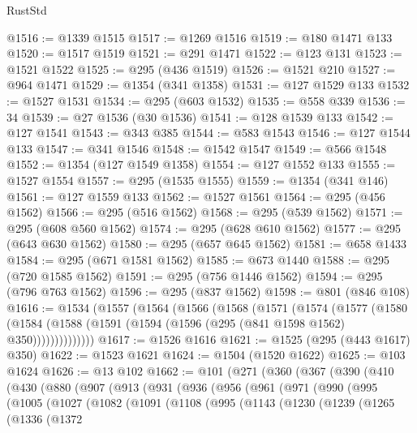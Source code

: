 \begin{lexlean}{RustStd}
\begin{coremodule}
@1516 := @1339 @1515
@1517 := @1269 @1516
@1519 := @180 @1471 @133
@1520 := @1517 @1519
@1521 := @291 @1471
@1522 := @123 @131
@1523 := @1521 @1522
@1525 := @295 (@436 @1519)
@1526 := @1521 @210
@1527 := @964 @1471
@1529 := @1354 (@341 @1358)
@1531 := @127 @1529 @133
@1532 := @1527 @1531
@1534 := @295 (@603 @1532)
@1535 := @558 @339
@1536 := 34
@1539 := @27 @1536 (@30 @1536)
@1541 := @128 @1539 @133
@1542 := @127 @1541
@1543 := @343 @385
@1544 := @583 @1543
@1546 := @127 @1544 @133
@1547 := @341 @1546
@1548 := @1542 @1547
@1549 := @566 @1548
@1552 := @1354 (@127 @1549 @1358)
@1554 := @127 @1552 @133
@1555 := @1527 @1554
@1557 := @295 (@1535 @1555)
@1559 := @1354 (@341 @146)
@1561 := @127 @1559 @133
@1562 := @1527 @1561
@1564 := @295 (@456 @1562)
@1566 := @295 (@516 @1562)
@1568 := @295 (@539 @1562)
@1571 := @295 (@608 @560 @1562)
@1574 := @295 (@628 @610 @1562)
@1577 := @295 (@643 @630 @1562)
@1580 := @295 (@657 @645 @1562)
@1581 := @658 @1433
@1584 := @295 (@671 @1581 @1562)
@1585 := @673 @1440
@1588 := @295 (@720 @1585 @1562)
@1591 := @295 (@756 @1446 @1562)
@1594 := @295 (@796 @763 @1562)
@1596 := @295 (@837 @1562)
@1598 := @801 (@846 @108)
@1616 := @1534
    (@1557
      (@1564
        (@1566
          (@1568
            (@1571
              (@1574
                (@1577
                  (@1580
                    (@1584 (@1588 (@1591 (@1594 (@1596 (@295 (@841 @1598 @1562) @350))))))))))))))
@1617 := @1526 @1616
@1621 := @1525 (@295 (@443 @1617) @350)
@1622 := @1523 @1621
@1624 := @1504 (@1520 @1622)
@1625 := @103 @1624
@1626 := @13 @102
@1662 := @101
    (@271
      (@360
        (@367
          (@390
            (@410
              (@430
                (@880
                  (@907
                    (@913
                      (@931
                        (@936
                          (@956
                            (@961
                              (@971
                                (@990
                                  (@995
                                    (@1005
                                      (@1027
                                        (@1082
                                          (@1091
                                            (@1108
                                              (@995
                                                (@1143
                                                  (@1230
                                                    (@1239
                                                      (@1265
                                                        (@1336
                                                          (@1372

\end{coremodule}
\end{lexlean}
